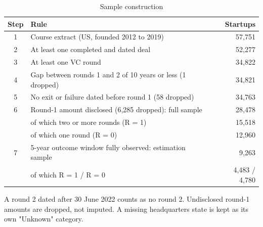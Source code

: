 \begin{table}[tbp]
\centering\footnotesize
\caption{Sample construction}
\label{tab:T3}
\begin{tabular}{clr}
\toprule
Step & Rule & Startups \\
\midrule
1 & Course extract (US, founded 2012 to 2019) & 57,751 \\
2 & At least one completed and dated deal & 52,277 \\
3 & At least one VC round & 34,822 \\
4 & Gap between rounds 1 and 2 of 10 years or less (1 dropped) & 34,821 \\
5 & No exit or failure dated before round 1 (58 dropped) & 34,763 \\
6 & Round-1 amount disclosed (6,285 dropped): full sample & 28,478 \\
 & of which two or more rounds (R = 1) & 15,518 \\
 & of which one round (R = 0) & 12,960 \\
7 & 5-year outcome window fully observed: estimation sample & 9,263 \\
 & of which R = 1 / R = 0 & 4,483 / 4,780 \\
\bottomrule
\end{tabular}
\par\smallskip\parbox{0.95\linewidth}{\scriptsize A round 2 dated after 30 June 2022 counts as no round 2. Undisclosed round-1 amounts are dropped, not imputed. A missing headquarters state is kept as its own "Unknown" category.}
\end{table}

